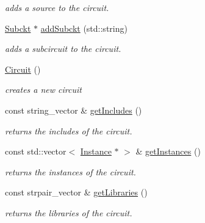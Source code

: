 \begin{DoxyCompactItemize}
\begin{DoxyCompactList}\small\item\em adds a source to the circuit. \end{DoxyCompactList}\item 
\hyperlink{class_s_p_i_c_e_1_1_subckt}{Subckt} $\ast$ \hyperlink{class_s_p_i_c_e_1_1_circuit_a0d1352e46d4537ce1e5f651de40e91a6}{add\+Subckt} (std\+::string)
\begin{DoxyCompactList}\small\item\em adds a subcircuit to the circuit. \end{DoxyCompactList}\item 
\mbox{\label{class_s_p_i_c_e_1_1_circuit_a2210ebc37eee536dbe9b44a89690256c}} 
\hyperlink{class_s_p_i_c_e_1_1_circuit_a2210ebc37eee536dbe9b44a89690256c}{Circuit} ()
\begin{DoxyCompactList}\small\item\em creates a new circuit \end{DoxyCompactList}\item 
\mbox{\label{class_s_p_i_c_e_1_1_circuit_a312beaf640e84589e6644820355c8ed6}} 
const string\+\_\+vector \& \hyperlink{class_s_p_i_c_e_1_1_circuit_a312beaf640e84589e6644820355c8ed6}{get\+Includes} ()
\begin{DoxyCompactList}\small\item\em returns the includes of the circuit. \end{DoxyCompactList}\item 
\mbox{\label{class_s_p_i_c_e_1_1_circuit_a8e6e58ffab876152a740092520c35d73}} 
const std\+::vector$<$ \hyperlink{class_s_p_i_c_e_1_1_instance}{Instance} $\ast$ $>$ \& \hyperlink{class_s_p_i_c_e_1_1_circuit_a8e6e58ffab876152a740092520c35d73}{get\+Instances} ()
\begin{DoxyCompactList}\small\item\em returns the instances of the circuit. \end{DoxyCompactList}\item 
\mbox{\label{class_s_p_i_c_e_1_1_circuit_a3e6a71a711e4796470f1a2a1dc42aef6}} 
const strpair\+\_\+vector \& \hyperlink{class_s_p_i_c_e_1_1_circuit_a3e6a71a711e4796470f1a2a1dc42aef6}{get\+Libraries} ()
\begin{DoxyCompactList}\small\item\em returns the libraries of the circuit. \end{DoxyCompactList}\item 

\end{DoxyCompactItemize}
